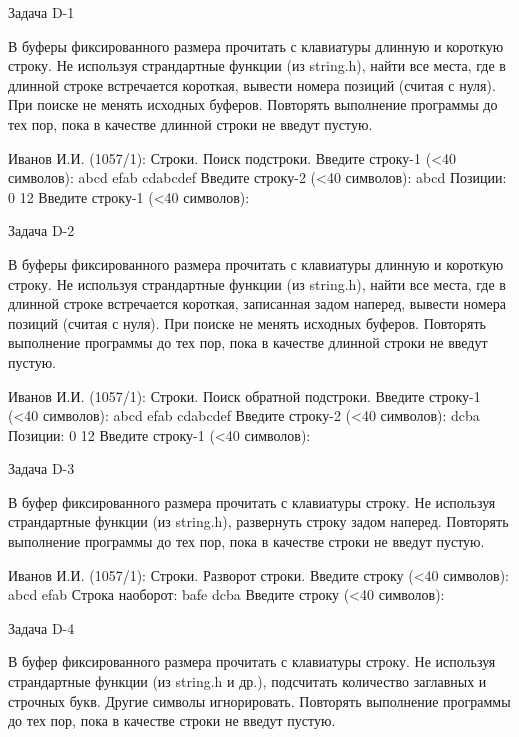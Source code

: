 
Задача D-1

В буферы фиксированного размера прочитать с клавиатуры длинную и короткую
строку. Не используя страндартные функции (из string.h), найти все места, где
в длинной строке встречается короткая, вывести номера позиций (считая с нуля).
При поиске не менять исходных буферов. Повторять выполнение программы до тех
пор, пока в качестве длинной строки не введут пустую.

Иванов И.И. (1057/1): Строки. Поиск подстроки.
Введите строку-1 (<40 символов): abcd efab cdabcdef
Введите строку-2 (<40 символов): abcd
Позиции: 0 12
Введите строку-1 (<40 символов):


Задача D-2

В буферы фиксированного размера прочитать с клавиатуры длинную и короткую
строку. Не используя страндартные функции (из string.h), найти все места, где
в длинной строке встречается короткая, записанная задом наперед, вывести
номера позиций (считая с нуля). При поиске не менять исходных буферов.
Повторять выполнение программы до тех пор, пока в качестве длинной строки не
введут пустую.

Иванов И.И. (1057/1): Строки. Поиск обратной подстроки.
Введите строку-1 (<40 символов): abcd efab cdabcdef
Введите строку-2 (<40 символов): dcba
Позиции: 0 12
Введите строку-1 (<40 символов):


Задача D-3

В буфер фиксированного размера прочитать с клавиатуры строку. Не используя
страндартные функции (из string.h), развернуть строку задом наперед. Повторять
выполнение программы до тех пор, пока в качестве строки не введут пустую.

Иванов И.И. (1057/1): Строки. Разворот строки.
Введите строку (<40 символов): abcd efab
Строка наоборот: bafe dcba
Введите строку (<40 символов):


Задача D-4

В буфер фиксированного размера прочитать с клавиатуры строку. Не используя
страндартные функции (из string.h и др.), подсчитать количество заглавных и
строчных букв. Другие символы игнорировать. Повторять выполнение программы до
тех пор, пока в качестве строки не введут пустую.

